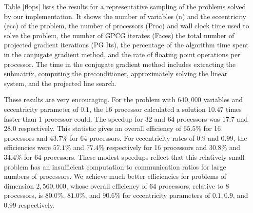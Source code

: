 Table \ref{flops} lists the results for a representative sampling of the
problems solved by our implementation.
It shows the number of variables (n) and the eccentricity (ecc)
of the problem, the number of processors (Proc) and
wall clock time used to solve the problem, the number of GPCG iterates (Faces)
the total number of projected gradient
iterations (PG Its), the percentage of the algorithm time spent in the
conjugate
gradient method, and the rate
of floating point operations per processor.
The time in the conjugate gradient method includes extracting the submatrix,
computing the preconditioner, approximately solving the linear system,
and the projected line search.

These results are very encouraging.  For the problem with
$640,000$ variables and eccentricity parameter of $0.1$, the
16 processor calculated a solution $10.47$ times faster
than $1$ processor could. The speedup for 32 and 64 processors
was $17.7$ and $28.0$ respectively.
This statistic gives an overall
efficiency of $65.5\%$ for 16 processors and $43.7\% $ for 64 processors.
For eccentricity rates of $0.9$ and $0.99$,
the efficiencies were $57.1\%$ and $77.4\%$ respectively
for 16 processors and $30.8\%$ and $34.4\% $ for 64 processors.
These modest speedups reflect that this relatively small problem
has an insufficient computation to communication ratios
for large numbers of processors.
We achieve much better efficiencies for
problems of dimension $2,560,000$, whose overall efficiency
of 64 processors, relative to 8 processors, is
$80.0\%$, $81.0\%$, and $90.6\%$ for eccentricity parameters
of $0.1, 0.9$, and $0.99$ respectively.


